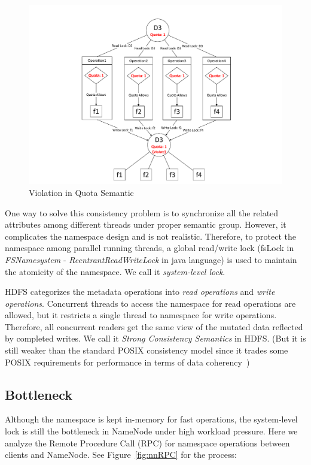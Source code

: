 \begin{figure}[h]
	\centering
	\includegraphics[scale=0.7]{figs/hdfsquota.pdf}
	\caption{Violation in Quota Semantic}
	\label{fig:hdfsquota}
\end{figure}

\noindent One way to solve this consistency problem is to synchronize all the related attributes among different threads under proper semantic group. However, it complicates the namespace design and is not realistic. Therefore, to protect the namespace among parallel running threads, a global read/write lock (fsLock in \textit{FSNamesystem} - \textit{ReentrantReadWriteLock} in java language) is used to maintain the atomicity of the namespace. We call it \textit{system-level lock}.

\noindent HDFS categorizes the metadata operations into \textit{read operations} and \textit{write operations}. Concurrent threads to access the namespace for read operations are allowed, but it restricts a single thread to namespace for write operations. Therefore, all concurrent readers get the same view of the mutated data reflected by completed writes. We call it \textit{Strong Consistency Semantics} in HDFS. (But it is still weaker than the standard POSIX consistency model since it trades some POSIX requirements for performance in terms of data coherency~\cite{white2012hadoop})

\subsection{Bottleneck}

\noindent Although the namespace is kept in-memory for fast operations, the system-level lock is still the bottleneck in NameNode under high workload pressure. Here we analyze the Remote Procedure Call (RPC) for namespace operations between clients and NameNode. See Figure~\ref{fig:nnRPC} for the process:

